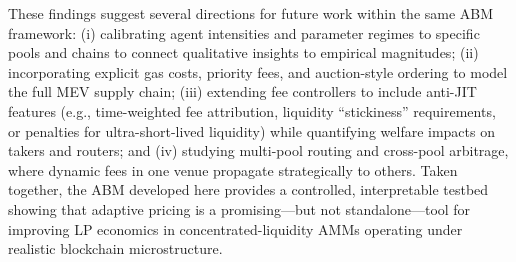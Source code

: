 \documentclass[11pt]{article}
\begin{document}
These findings suggest several directions for future work within the same ABM framework: (i) calibrating agent 
intensities and parameter regimes to specific pools and chains to connect qualitative insights to empirical magnitudes; 
(ii) incorporating explicit gas costs, priority fees, and auction-style ordering to model the full MEV supply chain; 
(iii) extending fee controllers to include anti-JIT features (e.g., time-weighted fee attribution, liquidity “stickiness” 
requirements, or penalties for ultra-short-lived liquidity) while quantifying welfare impacts on takers and routers; 
and (iv) studying multi-pool routing and cross-pool arbitrage, where dynamic fees in one venue propagate strategically 
to others. Taken together, the ABM developed here provides a controlled, interpretable testbed showing that adaptive 
pricing is a promising—but not standalone—tool for improving LP economics in concentrated-liquidity AMMs operating under 
realistic blockchain microstructure. 


\FloatBarrier




\end{document}
